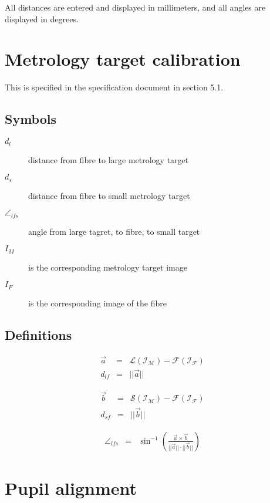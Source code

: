 \documentclass[11pt,a4paper,twoside]{scrartcl}
\begin{document}
All distances are entered and displayed in millimeters, and all angles
are displayed in degrees.

\section{Metrology target calibration}

This is specified in the specification document in section 5.1.
\subsection{Symbols}

\begin{description}
\item[$d_l$] distance from fibre to large metrology target
\item[$d_s$] distance from fibre to small metrology target
\item[$\angle_{lfs}$] angle from large tagret, to fibre, to small target
\item[$I_M$] is the corresponding metrology target image
\item[$I_F$] is the corresponding image of the fibre
\end{description}

\subsection{Definitions}

\begin{eqnarray}
  \vec{a} & =  & \mathcal{L(I_M)} - \mathcal{F(I_F)} \\
  d_{lf} & = &  ||\vec{a}||
\end{eqnarray}

\begin{eqnarray}
  \vec{b} & = & \mathcal{S(I_M)} - \mathcal{F(I_F)} \\
  d_{sf} & =  & ||\vec{b}||
\end{eqnarray}

\begin{eqnarray}
  \angle_{lfs} & = &  \sin^{-1}( \frac{\vec{a} \times \vec{b}}{||\vec{a}|| \cdot ||\vec{b}||} )
\end{eqnarray}


\section{Pupil alignment}
\end{document}

